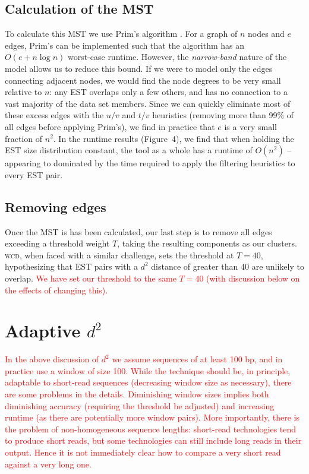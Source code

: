 \documentclass[a4paper,12pt]{article}
\newcommand{\mc}[1]{\textcolor{red}{#1}}
\begin{document}
\begin{appendix}
\subsection{Calculation of the MST}

To calculate this MST we use Prim's algorithm \cite{Prim57}.  For a
graph of $n$ nodes and $e$ edges, Prim's can be implemented such that
the algorithm has an $O(e + n \log n)$ worst-case runtime.  However,
the {\it narrow-band} nature of the model allows us to reduce this
bound.  If we were to model only the edges connecting adjacent nodes,
we would find the node degrees to be very small relative to $n$: any
EST overlaps only a few others, and has no connection to a vast
majority of the data set members.  Since we can quickly eliminate most
of these excess edges with the $u/v$ and $t/v$ heuristics (removing
more than 99\% of all edges before applying Prim's), we find in
practice that $e$ is a very small fraction of $n^2$.  In the
runtime results (Figure~4), we find that when holding the EST size
distribution constant, the tool as a whole has a runtime of $O(n^2)$
-- appearing to dominated by the time required to apply
the filtering heuristics to every EST pair.

\subsection{Removing edges}

Once the MST is has been calculated, our last step is to remove all
edges exceeding a threshold weight $T$, taking the resulting
components as our clusters.  \textsc{wcd}, when faced with a similar
challenge, sets the threshold at $T=40$, hypothesizing that EST pairs
with a $d^2$ distance of greater than 40 are unlikely to overlap.  \mc{We
have set our threshold to the same $T=40$ (with discussion below on
the effects of changing this).}

\section{Adaptive $d^2$}

\mc{In the above discussion of $d^2$ we assume sequences of at least 100
bp, and in practice use a window of size 100.  While the technique
should be, in principle, adaptable to short-read sequences (decreasing
window size as necessary), there are some problems in the details.
Diminishing window sizes implies both diminishing accuracy (requiring
the threshold be adjusted) and increasing runtime (as there are
potentially more window pairs).  More importantly, there is the
problem of non-homogeneous sequence lengths: short-read technologies
tend to produce short reads, but some technologies can still include
long reads in their output.  Hence it is not immediately clear how to
compare a very short read against a very long one.}


\end{appendix}
\end{document}
